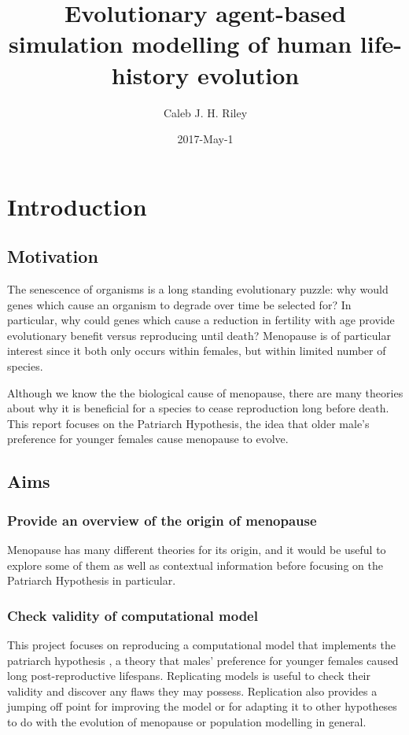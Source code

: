 \documentclass[authoryearcitations]{UoYCSproject}
\author{Caleb J. H. Riley}
\title{Evolutionary agent-based simulation modelling of human life-history evolution}
\date{2017-May-1}
\begin{document}
\maketitle
\listoffigures
\listoftables

\cleardoublepage

\chapter{Introduction}
\label{cha:Introduction}
\section{Motivation}
The senescence of organisms is a long standing evolutionary puzzle: why would genes which cause an organism to degrade over time be selected for? In particular, why could genes which cause a reduction in fertility with age provide evolutionary benefit versus reproducing until death? Menopause is of particular interest since it both only occurs within females, but within limited number of species.

Although we know the the biological cause of menopause, there are many theories about why it is beneficial for a species to cease reproduction long before death. This report focuses on the Patriarch Hypothesis, the idea that older male's preference for younger females cause menopause to evolve. 


\section{Aims}
\subsection{Provide an overview of the origin of menopause}
Menopause has many different theories for its origin, and it would be useful to explore some of them as well as contextual information before focusing on the Patriarch Hypothesis in particular.


\subsection{Check validity of computational model}
This project focuses on reproducing a computational model \cite{mateChoice2013} that implements the patriarch hypothesis \cite{patriarchHypothesis2000}, a theory that males' preference for younger females caused long post-reproductive lifespans. Replicating models is useful to check their validity and discover any flaws they may possess. Replication also provides a jumping off point for improving the model or for adapting it to other hypotheses to do with the evolution of menopause or population modelling in general. 
\end{document}
